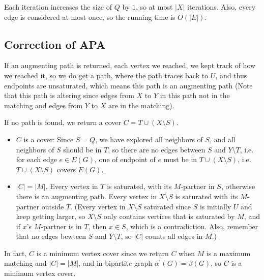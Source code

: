 \begin{observation}
    Each iteration increases the size of \(Q\) by \(1\), so at most \(\vert X \vert \) iterations. Also, every edge is considered at most once, so the running time is \(O(\vert E \vert )\).
\end{observation}


\subsection{Correction of APA}
If an augmenting path is returned, each vertex we reached, we kept track of how we reached it, so we do get a path, where the path traces back to \(U\), and thus endpoints are unsaturated, which means this path is an augmenting path (Note that this path is altering since edges from \(X\) to \(Y\) in this path not in the matching and edges from \(Y\) to \(X\) are in the matching). 

If no path is found, we return a cover \(C = T \cup (X \setminus S)\). 
\begin{itemize}
    \item [(1)] \(C\) is a cover: Since \(S = Q\), we have explored all neighbors of \(S\), and all neighbors of \(S\) should be in \(T\), so there are no edges between \(S\) and \(Y \setminus T\), i.e. for each edge \(e \in E(G)\), one of endpoint of \(e\) must be in \(T \cup (X \setminus S)\), i.e. \(T \cup (X \setminus S)\) covers \(E(G)\). 
    \item [(2)] \(\vert C \vert = \vert M \vert  \). Every vertex in \(T\) is saturated, with its \(M\)-partner in \(S\), otherwise there is an augmenting path. Every vertex in \(X \setminus S\) is saturated with its \(M\)-partner outside \(T\). (Every vertex in \(X \setminus S\) saturated since \(S\) is initially \(U\) and keep getting larger, so \(X \setminus S\) only contains vertices that is saturated by \(M\), and if \(x\)'s \(M\)-partner is in \(T\), then \(x \in S\), which is a contradiction. Also, remember that no edges bewteen \(S\) and \(Y \setminus T\), so \(\vert C \vert \) counts all edges in \(M\).)               
\end{itemize}

\begin{remark}
    In fact, \(C\) is a minimum vertex cover since we return \(C\) when \(M\) is a maximum matching and \(\vert C \vert = \vert M \vert\), and in bipartite graph \(\alpha ^{\prime} (G) = \beta (G)\), so \(C\) is a minimum vertex cover.      
\end{remark}

